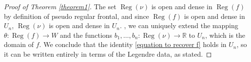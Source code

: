 \documentclass[10pt,a4paper]{amsart}
\DeclareMathOperator{\Reg}{Reg}
\newcommand{\ch}[1]{{\color{black} #1}}
\newcommand{\mb}{\mathbb}
\begin{document}
\begin{proof}[Proof of Theorem \ref{theorem1}]
	The set $\Reg(\nu)$ is \ch{open and} dense in $\Reg(f)$ by definition of pseudo regular frontal, and since $\Reg(f)$ is \ch{open and} dense in $U_n$, $\Reg(\nu)$ is \ch{open and} dense in $U_n$.
	, we can uniquely extend the mapping $\theta\colon \Reg(f) \to W$ and the functions $b_1,\dots,b_n\colon \Reg(\nu) \to \mb{R}$ to $U_n$, which is the domain of $f$.
	We conclude that the identity \eqref{equation to recover f} holds in $U_n$, so it can be written entirely in terms of the Legendre data, as stated.
\end{proof}
\end{document}
